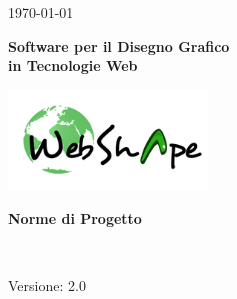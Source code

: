  
\title{\TITOLODOC}
\author{Carollo Mirko}
 

 
\renewcommand{\insertversion}{2.0} %
\renewcommand{\TITOLODOC}{Norme di Progetto} %
\renewcommand{\glosspath}{.\glossario} %
 
\begin{titlepage}
\begin{center}
  \begin{Large}  \today \end{Large}
\end{center}
 
\vspace{20pt}
 
\begin{center}
  \begin{Huge}
        \textbf{\ajax}
  \end{Huge}
\end{center}      
 
\begin{center}
  \begin{large}
        \textbf{Software per il Disegno Grafico\\ in Tecnologie Web}
  \end{large}
\end{center}      
 
\vspace{20pt}
 
\begin{center}
\includegraphics[width=150pt]{../logo/logo}
\end{center}
 
\vspace{170pt}
\begin{center} %
  \begin{Huge}
        \textbf{\TITOLODOC}
  \end{Huge}
      \\
\end{center}
\vspace{190pt}
\begin{center}
Versione: \insertversion
\end{center}
\end{titlepage}
 
